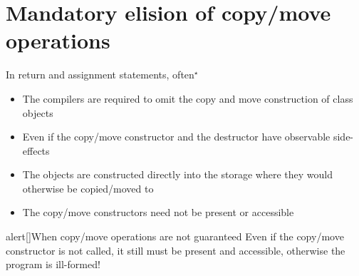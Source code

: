 \section{Mandatory elision of copy/move operations}
\begin{frame}{\insertsectionhead}
    In return and assignment statements, often$^{\star}$ {\footnotesize\quad{}}
    \begin{itemize}
        \item The compilers are required to omit the copy and move construction of class objects
        \item Even if the copy/move constructor and the destructor have observable side-effects
        \item The objects are constructed directly into the storage where they would otherwise be copied/moved to \item The copy/move constructors need not be present or accessible
    \end{itemize}
    \begin{varblock}{alert}[\textwidth]{When copy/move operations are not guaranteed}
        Even if the copy/move constructor is not called, it still must be present and accessible, otherwise the program is ill-formed!
    \end{varblock}
    \PrepareURLsymbol[PB]
\end{frame}
